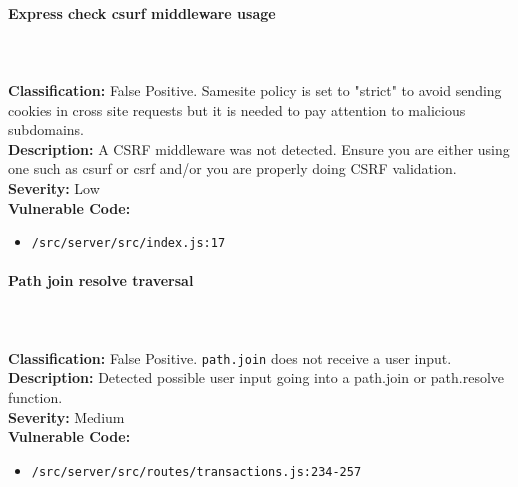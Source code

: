 \documentclass[]{article}
\begin{document}
\paragraph{Express check csurf middleware usage} \mbox{} \\ \\
\textbf{Classification:} False Positive. Samesite policy is set to "strict" to avoid sending cookies in cross site requests but it is needed to pay attention to malicious subdomains.
\\ \textbf{Description:} A CSRF middleware was not detected. Ensure you are either using one such as csurf or csrf and/or you are properly doing CSRF validation.
\\ \textbf{Severity:} Low
\\ \textbf{Vulnerable Code:}
\begin{itemize}
    \item \texttt{/src/server/src/index.js:17}
\end{itemize}

\paragraph{Path join resolve traversal} \mbox{} \\ \\
\textbf{Classification:} False Positive. \texttt{path.join} does not receive a user input.
\\ \textbf{Description:} Detected possible user input going into a path.join or path.resolve function.
\\ \textbf{Severity:} Medium
\\ \textbf{Vulnerable Code:}
\begin{itemize}
    \item \texttt{/src/server/src/routes/transactions.js:234-257}
\end{itemize}
\end{document}
